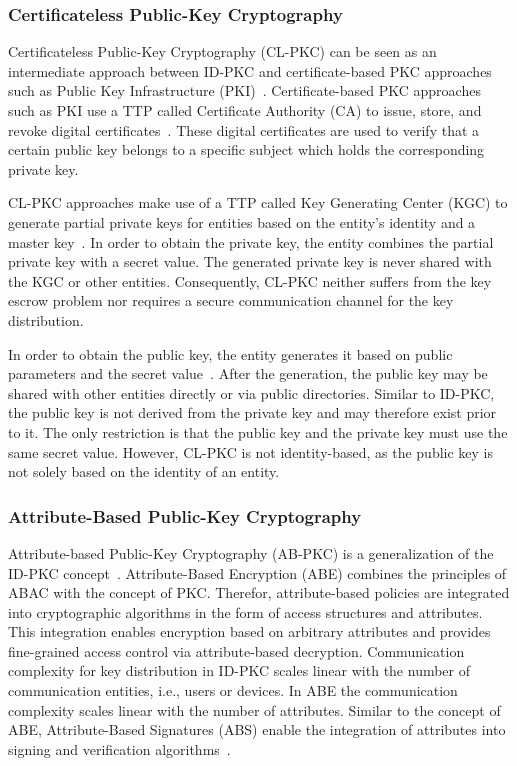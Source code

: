 \subsubsection{Certificateless Public-Key Cryptography}
Certificateless Public-Key Cryptography (CL-PKC) can be seen as an intermediate approach between ID-PKC and certificate-based PKC approaches such as Public Key Infrastructure (PKI)~\cite{AlRiyami2003}.
Certificate-based PKC approaches such as PKI use a TTP called Certificate Authority (CA) to issue, store, and revoke digital certificates~\cite{Eckert2023}.
These digital certificates are used to verify that a certain public key belongs to a specific subject which holds the corresponding private key.

CL-PKC approaches make use of a TTP called Key Generating Center (KGC) to generate partial private keys for entities based on the entity's identity and a master key~\cite{AlRiyami2003}.
In order to obtain the private key, the entity combines the partial private key with a secret value.
The generated private key is never shared with the KGC or other entities.
Consequently, CL-PKC neither suffers from the key escrow problem nor requires a secure communication channel for the key distribution.

In order to obtain the public key, the entity generates it based on public parameters and the secret value~\cite{AlRiyami2003}.
After the generation, the public key may be shared with other entities directly or via public directories.
Similar to ID-PKC, the public key is not derived from the private key and may therefore exist prior to it.
The only restriction is that the public key and the private key must use the same secret value.
However, CL-PKC is not identity-based, as the public key is not solely based on the identity of an entity.

\subsubsection{Attribute-Based Public-Key Cryptography}
Attribute-based Public-Key Cryptography (AB-PKC) is a generalization of the ID-PKC concept~\cite{Sahai2005,Goyal2006,Hu2023}.
Attribute-Based Encryption (ABE) combines the principles of ABAC with the concept of PKC.
Therefor, attribute-based policies are integrated into cryptographic algorithms in the form of access structures and attributes.
This integration enables encryption based on arbitrary attributes and provides fine-grained access control via attribute-based decryption.
Communication complexity for key distribution in ID-PKC scales linear with the number of communication entities, i.e., users or devices.
In ABE the communication complexity scales linear with the number of attributes.
Similar to the concept of ABE, Attribute-Based Signatures (ABS) enable the integration of attributes into signing and verification algorithms~\cite{Li2010,Maji2011}.

